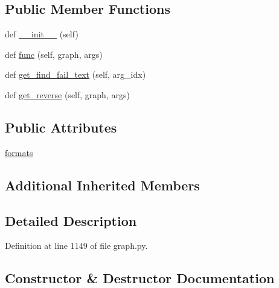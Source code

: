 \subsection*{Public Member Functions}
\begin{DoxyCompactItemize}
\item 
def \hyperlink{classlight__chats_1_1graph_1_1HugFunction_a81c1cd2d40ab9b90fe143276b63b0090}{\+\_\+\+\_\+init\+\_\+\+\_\+} (self)
\item 
def \hyperlink{classlight__chats_1_1graph_1_1HugFunction_a581fcc58cb0a76a19a02d8c87d911fb9}{func} (self, graph, args)
\item 
def \hyperlink{classlight__chats_1_1graph_1_1HugFunction_a3a8b8178a34dff402172109bcd9c9ebf}{get\+\_\+find\+\_\+fail\+\_\+text} (self, arg\+\_\+idx)
\item 
def \hyperlink{classlight__chats_1_1graph_1_1HugFunction_ae028317cf500a21a8787b73ca7964e48}{get\+\_\+reverse} (self, graph, args)
\end{DoxyCompactItemize}
\subsection*{Public Attributes}
\begin{DoxyCompactItemize}
\item 
\hyperlink{classlight__chats_1_1graph_1_1HugFunction_a9671b61b4a4c5e2d97093da92ec4a431}{formats}
\end{DoxyCompactItemize}
\subsection*{Additional Inherited Members}


\subsection{Detailed Description}
\begin{DoxyVerb}
\end{DoxyVerb}
 

Definition at line 1149 of file graph.\+py.



\subsection{Constructor \& Destructor Documentation}
\mbox{\label{classlight__chats_1_1graph_1_1HugFunction_a81c1cd2d40ab9b90fe143276b63b0090}} 
